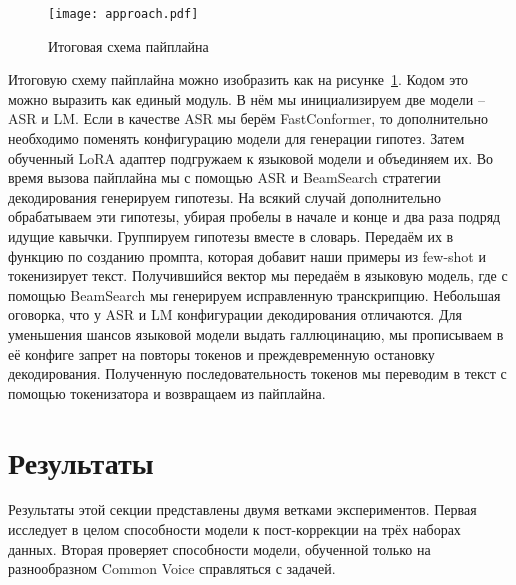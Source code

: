 \begin{figure}[!t]
  \centering
  \texttt{[image: approach.pdf]}
  \caption{Итоговая схема пайплайна}
  \label{fig:approach}
\end{figure}

Итоговую схему пайплайна можно изобразить как на рисунке~\ref{fig:approach}.
Кодом это можно выразить как единый модуль.
В нём мы инициализируем две модели -- ASR и LM.
Если в качестве ASR мы берём FastConformer, то дополнительно необходимо поменять конфигурацию модели для генерации гипотез.
Затем обученный LoRA адаптер подгружаем к языковой модели и объединяем их.
Во время вызова пайплайна мы с помощью ASR и BeamSearch стратегии декодирования генерируем гипотезы.
На всякий случай дополнительно обрабатываем эти гипотезы, убирая пробелы в начале и конце и два раза подряд идущие кавычки.
Группируем гипотезы вместе в словарь.
Передаём их в функцию по созданию промпта, которая добавит наши примеры из few-shot и токенизирует текст.
Получившийся вектор мы передаём в языковую модель, где с помощью BeamSearch мы генерируем исправленную транскрипцию.
Небольшая оговорка, что у ASR и LM конфигурации декодирования отличаются.
Для уменьшения шансов языковой модели выдать галлюцинацию, мы прописываем в её конфиге запрет на повторы токенов и преждевременную остановку декодирования.
Полученную последовательность токенов мы переводим в текст с помощью токенизатора и возвращаем из пайплайна.

\section{Результаты}

Результаты этой секции представлены двумя ветками экспериментов.
Первая исследует в целом способности модели к пост-коррекции на трёх наборах данных.
Вторая проверяет способности модели, обученной только на разнообразном Common Voice справляться с задачей.

